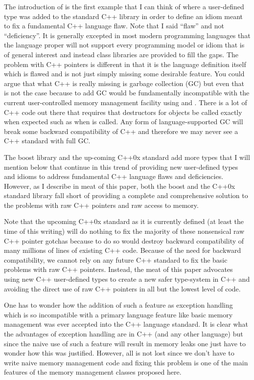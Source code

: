 \documentclass[pdf,ps2pdf,11pt]{SANDreport}
\begin{document}
The introduction of {} is the first example
that I can think of where a user-defined type was added to the
standard C++ library in order to define an idiom meant to fix a
fundamental C++ language flaw.  Note that I said ``flaw'' and not
``deficiency''.  It is generally excepted in most modern programming
languages that the language proper will not support every programming
model or idiom that is of general interest and instead class libraries
are provided to fill the gaps.  The problem with C++ pointers is
different in that it is the language definition itself which is flawed
and is not just simply missing some desirable feature.  You could
argue that what C++ is really missing is garbage collection (GC) but
even that is not the case because to add GC would be fundamentally
incompatible with the current user-controlled memory management
facility using {} and {}.  There is a lot
of C++ code out there that requires that destructors for objects be
called exactly when expected such as when {} is called.
Any form of language-supported GC will break some backward
compatibility of C++ and therefore we may never see a C++ standard
with full GC.

The boost library and the up-coming C++0x standard add more types that
I will mention below that continue in this trend of providing new
user-defined types and idioms to address fundamental C++ language
flaws and deficiencies.  However, as I describe in meat of this paper,
both the boost and the C++0x standard library fall short of providing
a complete and comprehensive solution to the problems with raw C++
pointers and raw access to memory.

Note that the upcoming C++0x standard as it is currently defined (at
least the time of this writing) will do nothing to fix the majority of
these nonsensical raw C++ pointer gotchas because to do so would
destroy backward compatibility of many millions of lines of existing
C++ code.  Because of the need for backward compatibility, we cannot
rely on any future C++ standard to fix the basic problems with raw C++
pointers.  Instead, the meat of this paper advocates using new C++
user-defined types to create a new safer type-system in C++ and
avoiding the direct use of raw C++ pointers in all but the lowest
level of code.

One has to wonder how the addition of such a feature as exception
handling which is so incompatible with a primary language feature like
basic memory management was ever accepted into the C++ language
standard.  It is clear what the advantages of exception handling are
in C++ (and any other language) but since the naive use of such a
feature will result in memory leaks one just have to wonder how this
was justified.  However, all is not lost since we don't have to write
naive memory management code and fixing this problem is one of the
main features of the memory management classes proposed here.
\end{document}
